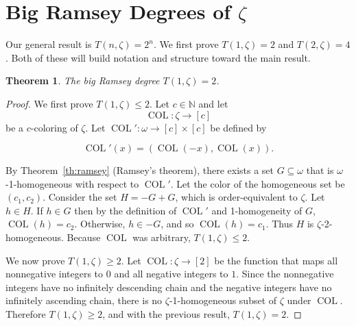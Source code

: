 \documentclass[10pt,a4paper]{article}
\newcommand{\om}{\omega}
\newcommand{\setconcat}{+}
\newcommand{\COL}{\operatorname{COL}}
\newcommand{\N}{\mathbb{N}}
\newcommand{\numcolors}{c}
\theoremstyle{plain}
\newtheorem{theorem}{Theorem}[section]
\theoremstyle{definition}
\begin{document}
\section{Big Ramsey Degrees of \texorpdfstring{$\zeta$}{Z}}\label{se:Z}


Our general result is $T(n, \zeta) = 2^n$.
We first prove $T(1,\zeta)=2$
and $T(2,\zeta)=4$. Both of these will 
build notation and structure toward the main result.

\begin{theorem}
The big Ramsey degree $T(1,\zeta)=2$. 
\end{theorem}

\begin{proof}
We first prove $T(1,\zeta)\leq 2$. Let $\numcolors \in \N$ and let $$\COL\colon \zeta\to [\numcolors]$$ be a 
$\numcolors$-coloring of $\zeta$.
Let $\COL'\colon \omega \to [\numcolors]\times[\numcolors]$ be defined by 

$$\COL'(x) = (\COL(-x),\COL(x)).$$

By Theorem~\ref{th:ramsey} (Ramsey's theorem), there exists a set $G \subseteq \om$
that is $\om$-1-homogeneous with respect to $\COL'$. Let the color of the homogeneous set be $(c_1, c_2)$.
Consider the set $H=-G \setconcat G$, which is order-equivalent to $\zeta$. Let $h \in H$. If $h 
\in G$ then by the definition of $\COL'$ and 1-homogeneity of $G$, $\COL(h)=c_2$. Otherwise, $h\in -G$, and so $\COL(h)=c_1$. Thus $H$ is $\zeta$-2-homogeneous. Because $\COL$ was arbitrary, $T(1,\zeta)\leq 2$.

We now prove $T(1,\zeta)\geq 2$. Let $\COL\colon\zeta\to [2]$ be the function
that maps all nonnegative integers to $0$ and all
negative integers to $1$.
Since the nonnegative integers have no infinitely descending chain and the negative integers have no infinitely ascending chain, there is no $\zeta$-1-homogeneous subset of $\zeta$ under $\COL$. Therefore $T(1,\zeta)\geq 2$, and with the previous result, $T(1,\zeta) = 2$.
\end{proof}
\end{document}
